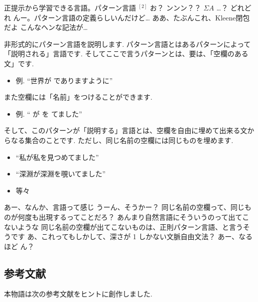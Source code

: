 \YUI 正提示から学習できる言語。パターン言語 ${}^{[2]}$
\YUZUKO お？
\YUI ンンン？？ $\Sigma A$ …？
\YUZUKO どれどれ
\YUI んー。パターン言語の定義らしいんだけど…
\YUZUKO ああ、たぶんこれ、Kleene閉包だよ
\YUI こんなヘンな記法が…

\begin{boxnote}
    非形式的にパターン言語を説明します.
    パターン言語とはあるパターンによって「説明される」言語です.
    そしてここで言うパターンとは、要は、「空欄のある文」です.
    
    \begin{itemize}
        \item 例. ``世界が \fbox{　　} でありますように''
    \end{itemize}

    また空欄には「名前」をつけることができます.

    \begin{itemize}
        \item 例. `` が  を  てました''
    \end{itemize}

    そして、このパターンが「説明する」言語とは、空欄を自由に埋めて出来る文からなる集合のことです.
    ただし、同じ名前の空欄には同じものを埋めます.

    \begin{itemize}
        \setlength{\itemsep}{0mm}
        \item ``私が私を見つめてました''
        \item ``深淵が深淵を覗いてました''
        \item 等々
    \end{itemize}
\end{boxnote}

\YUKARI あー、なんか、言語って感じ
\YUI うーん、そうかー？
\YUI 同じ名前の空欄って、同じものが何度も出現するってことだろ？
\YUI あんまり自然言語にそういうのって出てこないような
\YUZUKO 同じ名前の空欄が出てこないものは、正則パターン言語、と言うそうです
\YUKARI あ、これってもしかして、深さが 1 しかない文脈自由文法？
\YUI あー、なるほど
\YUI ん？

\subsection*{参考文献}

本物語は次の参考文献をヒントに創作しました.

